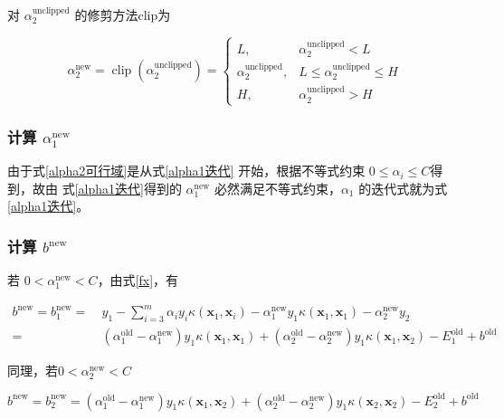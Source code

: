 \documentclass{ctexart}
\begin{document}
	对 $\alpha_{2}^\text{unclipped}$ 的修剪方法clip为
	
	\begin{equation}
		\alpha_{2}^\text{new}=\operatorname{clip}\left(\alpha_{2}^\text{unclipped}\right) =\left\{\begin{matrix}
			L,&\alpha_2^\text{unclipped}<L \\
			\alpha_2^\text{unclipped},&L\leqslant \alpha_2^\text{unclipped}\leqslant H\\
			H,&\alpha_2^\text{unclipped}>H
		\end{matrix}\right.
		\label{迭代式}
	\end{equation}

	\subsubsection{计算 $\alpha_{1}^{\operatorname{new}}$}
	
	由于式\eqref{alpha2可行域}是从式\eqref{alpha1迭代} 开始，根据不等式约束 $0\leqslant\alpha_{i}\leqslant C$得到，故由 式\eqref{alpha1迭代}得到的 $\alpha_{1}^\text{new}$ 必然满足不等式约束，$\alpha_{1}$ 的迭代式就为式\eqref{alpha1迭代}。
	
	\subsubsection{计算 $b^{\text{new}}$}
	
	若 $0<\alpha_{1}^\text{new}<C$，由式\eqref{fx}，有
	
	\begin{equation}
		\begin{aligned}
			b^\text{new}=b_1^\text{new}=&\ y_1-\sum_{i=3}^m\alpha_{i}y_i\kappa(\boldsymbol{x}_1,\boldsymbol{x}_i)-\alpha_{1}^\text{new}y_1\kappa(\boldsymbol{x}_1,\boldsymbol{x}_1)-\alpha_{2}^\text{new}y_2\\
			=&\ (\alpha_{1}^\text{old}-\alpha_{1}^\text{new})y_1\kappa(\boldsymbol{x}_1,\boldsymbol{x}_1)+(\alpha_{2}^\text{old}-\alpha_{2}^\text{new})y_1\kappa(\boldsymbol{x}_1,\boldsymbol{x}_2)-E_1^\text{old}+b^\text{old}
		\end{aligned}
	\end{equation}

	同理，若$0<\alpha_{2}^\text{new}<C$
	
	\begin{equation}
		b^\text{new}=b_2^\text{new}=(\alpha_{1}^\text{old}-\alpha_{1}^\text{new})y_1\kappa(\boldsymbol{x}_1,\boldsymbol{x}_2)+(\alpha_{2}^\text{old}-\alpha_{2}^\text{new})y_1\kappa(\boldsymbol{x}_2,\boldsymbol{x}_2)-E_2^\text{old}+b^\text{old}
	\end{equation}
\end{document}
